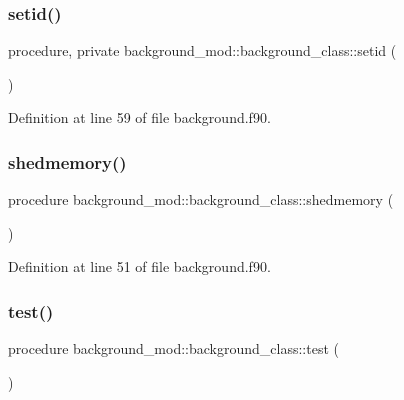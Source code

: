 \subsubsection{\texorpdfstring{setid()}{setid()}}
{\footnotesize\ttfamily procedure, private background\+\_\+mod\+::background\+\_\+class\+::setid (\begin{DoxyParamCaption}{ }\end{DoxyParamCaption})\hspace{0.3cm}{\ttfamily [private]}}



Definition at line 59 of file background.\+f90.

\mbox{\label{structbackground__mod_1_1background__class_adbeedbb2d82107fe8dca02b72ffadcec}} 
\subsubsection{\texorpdfstring{shedmemory()}{shedmemory()}}
{\footnotesize\ttfamily procedure background\+\_\+mod\+::background\+\_\+class\+::shedmemory (\begin{DoxyParamCaption}{ }\end{DoxyParamCaption})\hspace{0.3cm}{\ttfamily [private]}}



Definition at line 51 of file background.\+f90.

\mbox{\label{structbackground__mod_1_1background__class_abe7c9e689ba522cbd15754980ef1cc47}} 
\subsubsection{\texorpdfstring{test()}{test()}}
{\footnotesize\ttfamily procedure background\+\_\+mod\+::background\+\_\+class\+::test (\begin{DoxyParamCaption}{ }\end{DoxyParamCaption})\hspace{0.3cm}{\ttfamily [private]}}



